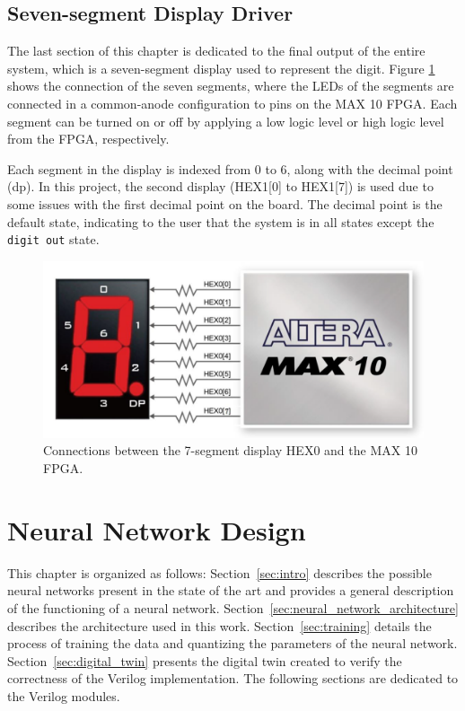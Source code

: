 \documentclass[11pt]{report}
\begin{document}
\section{Seven-segment Display Driver}
\label{sec:seven_segment_driver}

The last section of this chapter is dedicated to the final output of the entire system, which is a seven-segment display used to represent the digit. Figure \ref{fig:seven_segments} shows the connection of the seven segments, where the LEDs of the segments are connected in a common-anode configuration to pins on the MAX 10 FPGA. Each segment can be turned on or off by applying a low logic level or high logic level from the FPGA, respectively. 

Each segment in the display is indexed from 0 to 6, along with the decimal point (dp). In this project, the second display (HEX1[0] to HEX1[7]) is used due to some issues with the first decimal point on the board. The decimal point is the default state, indicating to the user that the system is in all states except the \texttt{digit out} state.

\begin{figure}[!h]
    \centering
    \includegraphics[width=0.8\linewidth]{images/controller/seven_segm.png}
    \caption{Connections between the 7-segment display HEX0 and the MAX 10 FPGA.}
    \label{fig:seven_segments}
\end{figure}

\chapter{Neural Network Design}

This chapter is organized as follows: Section~\ref{sec:intro} describes the possible neural networks present in the state of the art and provides a general description of the functioning of a neural network. Section~\ref{sec:neural_network_architecture} describes the architecture used in this work. Section~\ref{sec:training} details the process of training the data and quantizing the parameters of the neural network. Section~\ref{sec:digital_twin} presents the digital twin created to verify the correctness of the Verilog implementation. The following sections are dedicated to the Verilog modules.
\end{document}
